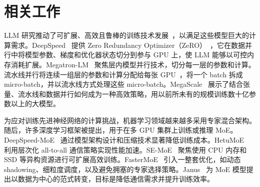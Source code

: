 \section{相关工作}
\label{sec:related}

 LLM 研究推动了可扩展、高效且鲁棒的训练技术发展~\cite{rasley2020deepspeed, shoeybi2019megatron, jiang2024megascale, zhang2025disttrain}，以满足这些模型巨大的计算需求。DeepSpeed~\cite{rasley2020deepspeed} 提供 Zero Redundancy Optimizer（ZeRO）~\cite{rajbhandari2020zero, rajbhandari2021zero, ren2021zero}，它在数据并行中将模型参数、梯度和优化器状态切分到参与 GPU 上，使 LLM 能够以可控内存消耗扩展。Megatron-LM~\cite{shoeybi2019megatron} 聚焦层内模型并行技术，切分每一层的参数和计算。流水线并行将连续一组层的参数和计算分配给每张 GPU~\cite{huang2019gpipe, narayanan2019pipedream}，将一个 batch 拆成 micro-batch，并以流水线方式处理这些 micro-batch。MegaScale~\cite{jiang2024megascale} 展示了结合张量、流水线和数据并行如何成为一种高效策略，用以前所未有的规模训练数十亿参数以上的大模型。

 为应对训练先进神经网络的计算挑战，机器学习领域越来越多采用专家混合架构。随后，许多深度学习框架被提出，用于在多 GPU 集群上训练或推理 MoE。DeepSpeed-MoE~\cite{rajbhandari2022deepspeed} 通过模型架构设计和压缩技术显著降低训练成本。HetuMoE~\cite{nie2022hetumoe} 利用层次化 all-to-all 通信策略实现性能加速。SE-MoE~\cite{shen2022se} 聚焦使用 CPU 内存和 SSD 等异构资源进行可扩展高效训练。FasterMoE~\cite{he2022fastermoe} 引入一整套优化，如动态 shadowing、细粒度调度，以及避免拥塞的专家选择策略。Janus~\cite{liu2023janus} 为 MoE 模型提出以数据为中心的范式转变，目标是降低通信需求并提升训练效率。


